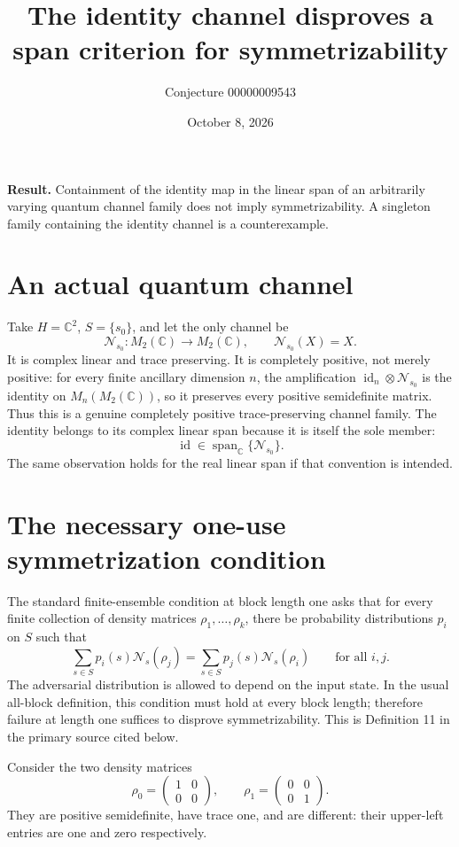 \documentclass[11pt]{article}
\title{The identity channel disproves a span criterion for symmetrizability}
\author{Conjecture 00000009543}
\date{October 8, 2026}
\begin{document}
\maketitle
\noindent\textbf{Result.} Containment of the identity map in the linear span of an arbitrarily varying quantum channel family does not imply symmetrizability. A singleton family containing the identity channel is a counterexample.

\section*{An actual quantum channel}
Take $H=\mathbb C^2$, $S=\{s_0\}$, and let the only channel be
\[
 \mathcal N_{s_0}:M_2(\mathbb C)\longrightarrow M_2(\mathbb C),
 \qquad\mathcal N_{s_0}(X)=X.
\]
It is complex linear and trace preserving. It is completely positive, not merely positive: for every finite ancillary dimension $n$, the amplification
$\operatorname{id}_n\otimes\mathcal N_{s_0}$ is the identity on $M_n(M_2(\mathbb C))$, so it preserves every positive semidefinite matrix. Thus this is a genuine completely positive trace-preserving channel family.
The identity belongs to its complex linear span because it is itself the sole member:
\[
 \operatorname{id}\in\operatorname{span}_{\mathbb C}\{\mathcal N_{s_0}\}.
\]
The same observation holds for the real linear span if that convention is intended.

\section*{The necessary one-use symmetrization condition}
The standard finite-ensemble condition at block length one asks that for every finite collection of density matrices $\rho_1,\ldots,\rho_k$, there be probability distributions $p_i$ on $S$ such that
\begin{equation}\label{eq:sym}
 \sum_{s\in S}p_i(s)\mathcal N_s(\rho_j)
 =\sum_{s\in S}p_j(s)\mathcal N_s(\rho_i)
 \qquad\text{for all }i,j.
\end{equation}
The adversarial distribution is allowed to depend on the input state. In the usual all-block definition, this condition must hold at every block length; therefore failure at length one suffices to disprove symmetrizability. This is Definition 11 in the primary source cited below.

Consider the two density matrices
\[
 \rho_0=\begin{pmatrix}1&0\\0&0\end{pmatrix},\qquad
 \rho_1=\begin{pmatrix}0&0\\0&1\end{pmatrix}.
\]
They are positive semidefinite, have trace one, and are different: their upper-left entries are one and zero respectively.
\end{document}

